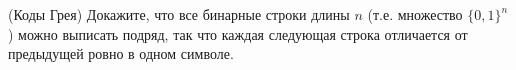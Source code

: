 (Коды Грея) Докажите, что все бинарные строки длины $n$ (т.е. множество $\{0, 1\}^n$) можно выписать
подряд, так что каждая следующая строка отличается от предыдущей ровно в одном символе.
